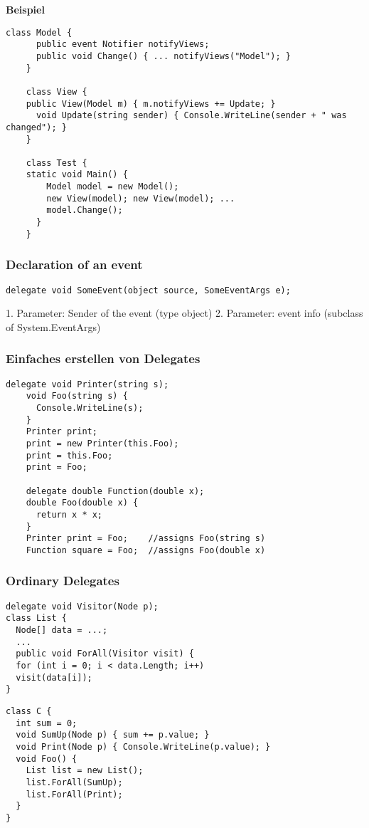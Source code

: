 \textbf{Beispiel}
\begin{lstlisting}[style=Csharp]
	class Model {
	  public event Notifier notifyViews;
	  public void Change() { ... notifyViews("Model"); }
	}
	
	class View {
  	public View(Model m) { m.notifyViews += Update; }
	  void Update(string sender) { Console.WriteLine(sender + " was changed"); }
	}
	
	class Test {
  	static void Main() {
    	Model model = new Model();
	    new View(model); new View(model); ...
	    model.Change();
	  }
	}
\end{lstlisting}

\subsubsection{Declaration of an event}
\begin{lstlisting}
delegate void SomeEvent(object source, SomeEventArgs e);
\end{lstlisting}
1. Parameter: Sender of the event (type object)
2. Parameter: event info (subclass of System.EventArgs)


\subsubsection{Einfaches erstellen von Delegates}
\begin{lstlisting}[style=CSharp]
	delegate void Printer(string s);
	void Foo(string s) {
	  Console.WriteLine(s);
	}
	Printer print;
	print = new Printer(this.Foo);
	print = this.Foo;
	print = Foo;
	
	delegate double Function(double x);
	double Foo(double x) {
	  return x * x;
	}
	Printer print = Foo;    //assigns Foo(string s)
	Function square = Foo;  //assigns Foo(double x)
\end{lstlisting}


\subsubsection{Ordinary Delegates}
\begin{multicols}{2}
	
\begin{lstlisting}[style=CSharp]
delegate void Visitor(Node p);
class List {
  Node[] data = ...;
  ...
  public void ForAll(Visitor visit) {
  for (int i = 0; i < data.Length; i++)
  visit(data[i]);
}
\end{lstlisting}

\columnbreak
  
\begin{lstlisting}[style=CSharp]
class C {
  int sum = 0;
  void SumUp(Node p) { sum += p.value; }
  void Print(Node p) { Console.WriteLine(p.value); }
  void Foo() {
    List list = new List();
    list.ForAll(SumUp);
    list.ForAll(Print);
  }
}
  \end{lstlisting}

\end{multicols}


